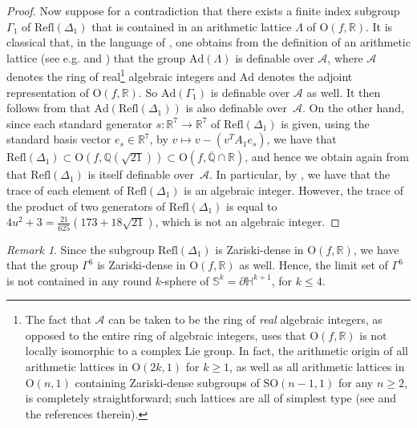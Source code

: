 \documentclass{amsart}
\theoremstyle{plain}
\theoremstyle{definition}
\theoremstyle{remark}
\newtheorem{remark}[theorem]{Remark}
\numberwithin{equation}{section}
\newcommand{\qq}{\mathbb Q}
\newcommand{\rr}{\mathbb R}
\renewcommand{\geq}{\geqslant}
\begin{document}
\begin{proof}
Now suppose for a contradiction that there exists a finite index subgroup $\Gamma_1$ of $\mathrm{Refl}(\Delta_1)$ that is contained in an arithmetic lattice $\Lambda$ of $\mathrm{O}(f,\rr)$. It is classical that, in the language of \cite{Vin71}, one obtains from the definition of an arithmetic lattice (see e.g. \cite[\S IX.1]{Margulis} and \cite[Theorem~2]{Vin71}) that the group $\mathrm{Ad}(\Lambda)$ is definable over $\mathcal{A}$, where $\mathcal{A}$ denotes the ring of real\footnote{The fact that $\mathscr{A}$ can be taken to be the ring of {\em real} algebraic integers, as opposed to the entire ring of algebraic integers, uses that $\mathrm{O}(f, \rr)$ is not locally isomorphic to a complex Lie group.
In fact, the arithmetic origin of all arithmetic lattices in $\mathrm{O}(2k,1)$ for $k \geq 1$, as well as all arithmetic lattices in $\mathrm{O}(n,1)$ containing Zariski-dense subgroups of $\mathrm{SO}(n-1,1)$ for any $n \geq 2$, is completely straightforward; such lattices are all of simplest type (see \cite{BBKS} and the references therein).} algebraic integers and $\mathrm{Ad}$ denotes the adjoint representation of $\mathrm{O}(f, \rr)$.
So $\mathrm{Ad}(\Gamma_1)$ is definable over $\mathcal{A}$ as well. 
It then follows from \cite[Theorem~3]{Vin71}  that $\mathrm{Ad}(\mathrm{Refl}(\Delta_1))$ is also definable over~$\mathcal{A}$. On the other hand, since each standard generator $s: \rr^7 \rightarrow \rr^7$ of $\mathrm{Refl}(\Delta_1)$ is given, using the standard basis vector $e_s \in \mathbb{R}^7$, by $v \mapsto v - (v^T A_1 e_s)$, we have that  $\mathrm{Refl}(\Delta_1) \subset \mathrm{O}(f,\qq(\sqrt{21})) \subset \mathrm{O}(f,\overline{\qq}\cap \mathbb{R})$, and hence we obtain again from \cite[Theorem~2]{Vin71} that $\mathrm{Refl}(\Delta_1)$ is itself definable over~$\mathcal{A}$. In particular, by \cite[Lem.~1]{Vin71}, we have that the trace of each element of $\mathrm{Refl}(\Delta_1)$ is an algebraic integer. 
However, the trace of the product of two generators of $\mathrm{Refl} (\Delta_1)$ is equal to $4u^2+3 = \frac{21}{625}(173 + 18 \sqrt{21})$, which is not an algebraic integer.
\end{proof}


\begin{remark}\label{rem:zariski_dense}
Since the subgroup $\mathrm{Refl}(\Delta_1)$ is Zariski-dense in $\mathrm{O}(f, \mathbb{R})$, we have that  the group $\Gamma^6$ is Zariski-dense in $\mathrm{O}(f, \rr)$ as well. 
Hence, the limit set of $\Gamma^6$ is not contained in any round $k$-sphere of $\mathbb{S}^k = \partial \mathbb{H}^{k+1}$, for $k \leqslant 4$.
\end{remark}
\end{document}
